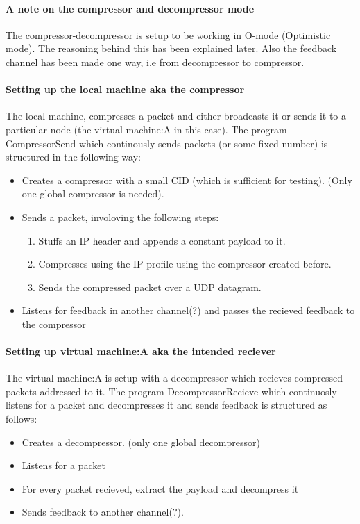 \documentclass[a4paper,11pt]{article}
\begin{document}
\paragraph{A note on the compressor and decompressor mode}
The compressor-decompressor is setup to be working in O-mode (Optimistic mode). The reasoning behind this has been explained later.
Also the feedback channel has been made one way, i.e from decompressor to compressor.

\paragraph{Setting up the local machine aka the compressor}
The local machine, compresses a packet and either broadcasts it or sends it to a particular node (the virtual machine:A in this case).
The program CompressorSend which continously sends packets (or some fixed number) is structured in the following way:
\begin{itemize}
	\item Creates a compressor with a small CID (which is sufficient for testing). (Only one global compressor is needed).
	\item Sends a packet, involoving the following steps:
	\begin{enumerate}
		\item Stuffs an IP header and appends a constant payload to it.
		\item Compresses using the IP profile using the compressor created before.
		\item Sends the compressed packet over a UDP datagram.
	\end{enumerate}
	\item Listens for feedback in another channel(?) and passes the recieved feedback to the compressor
\end{itemize}

\paragraph{Setting up virtual machine:A aka the intended reciever}
The virtual machine:A is setup with a decompressor which recieves compressed packets addressed to it.
The program DecompressorRecieve which continuosly listens for a packet and decompresses it and sends feedback is structured as follows:
\begin{itemize}
	\item Creates a decompressor. (only one global decompressor)
	\item Listens for a packet
	\item For every packet recieved, extract the payload and decompress it
	\item Sends feedback to another channel(?).
\end{itemize}
\end{document}

